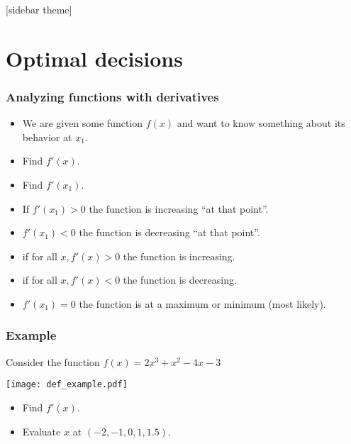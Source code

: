 \documentclass[xcolor=dvipsnames]{beamer} %
\begin{document}
\begin{frame}
\end{frame}

[sidebar theme]
\section{Optimal decisions}

\begin{frame}
\frametitle{Analyzing functions with derivatives}

\begin{itemize}
    \setlength\itemsep{1em}
\item We are given some function $f(x)$ and want to know something about its behavior at $x_1$.
\item Find $f'(x)$.
\item Find $f'(x_1)$.
\item If $f'(x_1) > 0$ the function is increasing ``at that point''.
\item $f'(x_1) < 0$ the function is decreasing ``at that point''.
\item if for all $x, f'(x) > 0$ the function is increasing.
\item if for all $x, f'(x) < 0$ the function is decreasing.
\item $f'(x_1) = 0$ the function is at a maximum or minimum (most likely). 
\end{itemize}
\end{frame}

\begin{frame}
\frametitle{Example}
Consider the function $f(x) = 2x^3 + x^2 - 4x - 3$

\begin{center}
\texttt{[image: def\_example.pdf]}
\end{center}

\begin{itemize}
\item Find $f'(x)$. 
\item Evaluate $x$ at $(-2, -1, 0, 1, 1.5)$.
\end{itemize}
\end{frame}
\end{document}
